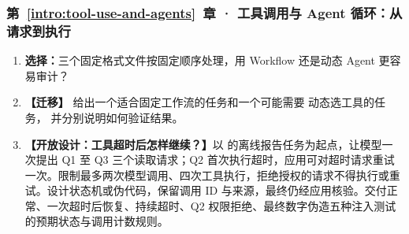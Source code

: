 \subsubsection*{第~\ref*{intro:tool-use-and-agents}~章 · 工具调用与 Agent 循环：从请求到执行}
\begin{enumerate}[label={},leftmargin=4.8em,itemsep=4pt]
\item[\textbf{C-107.}] \leavevmode{}\label{exercise:C-107}\label{exercise:fixed-workflow-audit}\textbf{选择：}三个固定格式文件按固定顺序处理，用 Workflow 还是动态 Agent 更容易审计？
\item[\textbf{C-108.}] \leavevmode{}\label{exercise:C-108}\label{exercise:workflow-agent-choice}\textbf{【迁移】} 给出一个适合固定工作流的任务和一个可能需要  动态选工具的任务，
并分别说明如何验证结果。
\item[\textbf{C-109.}] \leavevmode{}\label{exercise:C-109}\label{exercise:agent-bounded-retry-design}\textbf{【开放设计：工具超时后怎样继续？】}以  的离线报告任务为起点，让模型一次提出 Q1 至 Q3 三个读取请求；Q2 首次执行超时，应用可对超时请求重试一次。限制最多两次模型调用、四次工具执行，拒绝授权的请求不得执行或重试。设计状态机或伪代码，保留调用 ID 与来源，最终仍经应用核验。交付正常、一次超时后恢复、持续超时、Q2 权限拒绝、最终数字伪造五种注入测试的预期状态与调用计数规则。
\end{enumerate}
